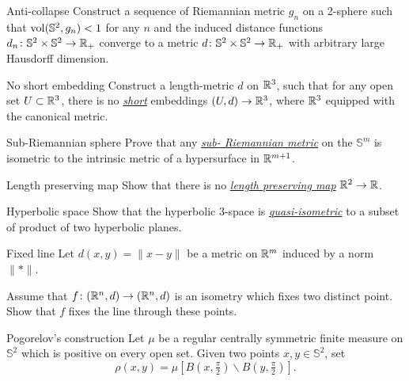 \documentclass[twoside]{book}
\begin{document}
\begin{pr}{}{Anti-collapse}\label{anti-collaps} Construct
a sequence of Riemannian metric $g_n$ on a 2-sphere such that 
$\operatorname{\rm vol} (\mathbb S^2,g_n)<1$ for any $n$ 
and the induced distance functions $d_n\colon\mathbb{S}^2\times \mathbb{S}^2\to \mathbb{R}_+$
converge to a metric $d\colon\mathbb{S}^2\times \mathbb{S}^2\to \mathbb{R}_+$ 
with arbitrary large Hausdorff dimension.
\end{pr}

{\begin{pr}{\hard}{No short embedding}\label{weird-metric} 
Construct a length-metric $d$ on $\mathbb{R}^3$,
such that for any open set $U\subset  \mathbb{R}^3$,
there is no \hyperref[Short map]{\emph{short}} embeddings $(U,d)\to \mathbb{R}^3$,
where $\mathbb{R}^3$ equipped with the canonical metric.
\end{pr}

\begin{pr}{\thm}{Sub-Riemannian sphere}\label{sub-Riemannian} 
Prove that any \hyperref[Sub-Riemannian metric]{\emph{sub-\hskip0mm Riemannian metric}} 
on the $\mathbb{S}^m$ is isometric to the intrinsic metric of a hypersurface in $\mathbb{R}^{m+1}$.
\end{pr}

\begin{pr}{\thm}{Length preserving map}\label{two2one} Show that there is no \hyperref[Length preserving map]{\emph{length preserving map}} $\mathbb{R}^2\to \mathbb{R}$.
\end{pr}



\begin{pr}{}{Hyperbolic space}\label{Hyperbolic space}
Show that the hyperbolic $3$-space is \hyperref[Quasi-isometry]{\emph{quasi-isometric}} to a subset of product of two hyperbolic planes.
\end{pr}

\begin{pr}{}{Fixed line}\label{Fixed line}
Let $d(x,y)=\|x-y\|$ be a metric on $\mathbb{R}^m$ induced by a norm $\|{*}\|$.

Assume that $f\colon(\mathbb{R}^n,d)\to(\mathbb{R}^n,d)$ is an isometry which fixes two distinct point.
Show that $f$ fixes the line through these points.
\end{pr}

\begin{pr}{}{Pogorelov's construction}\label{Pogorelov's construction}
Let $\mu$ be a regular centrally symmetric finite measure on $\mathbb{S}^2$ which is positive on every open set.
Given two points $x,y\in \mathbb{S}^2$,
set 
\[\rho(x,y)=\mu[B(x,\tfrac \pi2)\backslash B(y,\tfrac\pi2)].\]


\end{pr}}
\end{document}
